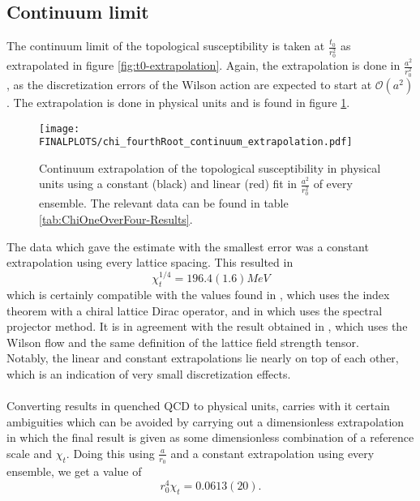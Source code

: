 \documentclass[a4paper,10pt]{book}
\begin{document}
\subsection{Continuum limit}
The continuum limit of the topological susceptibility is taken at $\frac{t_0}{r_0^2}$ as extrapolated in figure \ref{fig:t0-extrapolation}. Again, the extrapolation is done in $\frac{a^2}{r_0^2}$, as the discretization errors of the Wilson action are expected to start at $\mathcal{O}(a^2)$. The extrapolation is done in physical units and is found in figure \ref{fig:chiOneOver4-ContExtrap}.
\begin{figure}[htbp]
\centering
\texttt{[image: FINALPLOTS/chi\_fourthRoot\_continuum\_extrapolation.pdf]}
\caption[$\chi_t^{1/4}$ continuum extrapolation]{Continuum extrapolation of the topological susceptibility in physical units using a constant (black) and linear (red) fit in $\frac{a^2}{r_0^2}$ of every ensemble. The relevant data can be found in table \ref{tab:ChiOneOverFour-Results}.}\label{fig:chiOneOver4-ContExtrap}
\end{figure}
The data which gave the estimate with the smallest error was a constant extrapolation using every lattice spacing. This resulted in
\begin{equation}\label{eq:chiOneOverFour_result}
\chi^{1/4}_t = 196.4(1.6)MeV
\end{equation}
which is certainly compatible with the values found in \cite{PhysRevLett.94.032003}, which uses the index theorem with a chiral lattice Dirac operator, and in \cite{L_scher_2010} which uses the spectral projector method. It is in agreement with the result obtained in \cite{PhysRevD.92.094518}, which uses the Wilson flow and the same definition of the lattice field strength tensor.\\Notably, the linear and constant extrapolations lie nearly on top of each other, which is an indication of very small discretization effects.\\\\Converting results in quenched QCD to physical units, carries with it certain ambiguities which can be avoided by carrying out a dimensionless extrapolation in which the final result is given as some dimensionless combination of a reference scale and $\chi_t$. Doing this using $\frac{a}{r_0}$ and a constant extrapolation using every ensemble, we get a value of 
\begin{equation}\label{eq:r_04Chi_t}
r_0^4\chi_t = 0.0613(20).
\end{equation}
\end{document}
